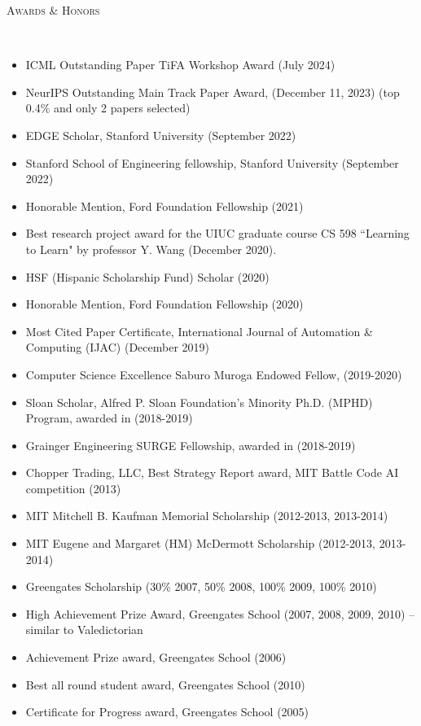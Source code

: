 \documentclass{article}
\newenvironment{changemargin}[2]{%
  \begin{list}{}{%
    \setlength{\topsep}{0pt}%
    \setlength{\leftmargin}{#1}%
    \setlength{\rightmargin}{#2}%
    \setlength{\listparindent}{\parindent}%
    \setlength{\itemindent}{\parindent}%
    \setlength{\parsep}{\parskip}%
  }%
  \item[]}{\end{list}
}
\newcommand{\lineover}{
	\begin{changemargin}{-0.05in}{-0.05in}
		\vspace*{-8pt}
		\hrulefill \\
		\vspace*{-2pt}
	\end{changemargin}
}
\newcommand{\header}[1]{
	\begin{changemargin}{-0.5in}{-0.5in}
		\scshape{#1}\\
  	\lineover
	\end{changemargin}
}
\newenvironment{body} {
	\vspace*{-16pt}
	\begin{changemargin}{-0.25in}{-0.5in}
  }	
	{\end{changemargin}
}
\begin{document}
\newpage


\header{Awards \& Honors}
\begin{body}
\vspace{16pt}
\begin{itemize} \itemsep -2pt
    \item ICML Outstanding Paper TiFA Workshop Award (July 2024)
    \item NeurIPS Outstanding Main Track Paper Award, (December 11, 2023) (top 0.4\% and only 2 papers selected)
    \item EDGE Scholar, Stanford University (September 2022)
    \item Stanford School of Engineering fellowship, Stanford University (September 2022)
    \item Honorable Mention, Ford Foundation Fellowship (2021)
    \item Best research project award for the UIUC graduate course CS 598 ``Learning to Learn" by professor Y. Wang (December 2020).
    \item HSF (Hispanic Scholarship Fund) Scholar (2020)
    \item Honorable Mention, Ford Foundation Fellowship (2020)
    \item Most Cited Paper Certificate, International Journal of Automation \& Computing (IJAC) (December 2019)
    \item Computer Science Excellence Saburo Muroga Endowed Fellow, (2019-2020)
	\item Sloan Scholar, Alfred P. Sloan Foundation’s Minority Ph.D. (MPHD) Program, awarded in (2018-2019)
	\item Grainger Engineering SURGE Fellowship, awarded in (2018-2019)
	\item Chopper Trading, LLC, Best Strategy Report award, MIT Battle Code AI competition (2013)
	\item MIT Mitchell B. Kaufman Memorial Scholarship (2012-2013, 2013-2014)
	\item MIT Eugene and Margaret (HM) McDermott Scholarship (2012-2013, 2013-2014)
 	\item Greengates Scholarship (30\% 2007, 50\% 2008, 100\% 2009, 100\% 2010)
	\item High Achievement Prize Award, Greengates School (2007, 2008, 2009, 2010) -- similar to Valedictorian
        \item Achievement Prize award, Greengates School (2006)
	\item Best all round student award, Greengates School (2010)
	\item Certificate for Progress award, Greengates School (2005)
\end{itemize}
\end{body}
\end{document}
